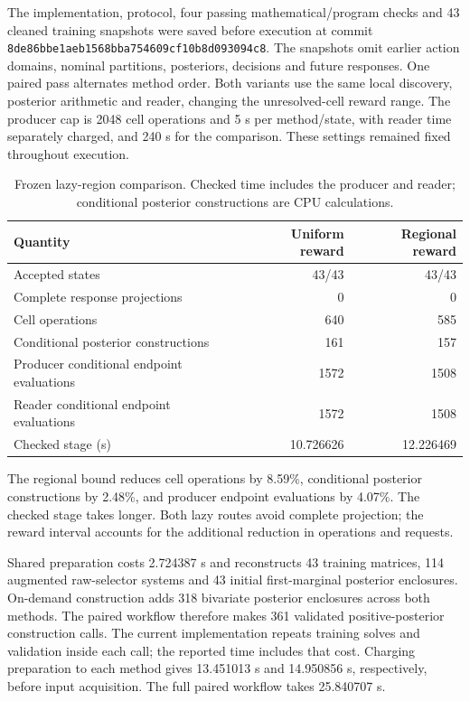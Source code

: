 The implementation, protocol, four passing mathematical/program checks and 43 cleaned training snapshots were saved before execution at commit \texttt{8de86bbe1aeb1568bba754609cf10b8d093094c8}. The snapshots omit earlier action domains, nominal partitions, posteriors, decisions and future responses. One paired pass alternates method order. Both variants use the same local discovery, posterior arithmetic and reader, changing the unresolved-cell reward range. The producer cap is 2048 cell operations and 5 s per method/state, with reader time separately charged, and 240 s for the comparison. These settings remained fixed throughout execution.

\begin{table}[htbp]\centering\small
\caption{Frozen lazy-region comparison. Checked time includes the producer and reader; conditional posterior constructions are CPU calculations.}\label{tab:lazy_summary}
\begin{tabular}{lrr}\toprule
Quantity & Uniform reward & Regional reward\\\midrule
Accepted states & 43/43 & 43/43\\
Complete response projections & 0 & 0\\
Cell operations & 640 & 585\\
Conditional posterior constructions & 161 & 157\\
Producer conditional endpoint evaluations & 1572 & 1508\\
Reader conditional endpoint evaluations & 1572 & 1508\\
Checked stage (s) & 10.726626 & 12.226469\\
\bottomrule\end{tabular}\end{table}

The regional bound reduces cell operations by 8.59\%, conditional posterior constructions by 2.48\%, and producer endpoint evaluations by 4.07\%. The checked stage takes longer. Both lazy routes avoid complete projection; the reward interval accounts for the additional reduction in operations and requests.

Shared preparation costs 2.724387 s and reconstructs 43 training matrices, 114 augmented raw-selector systems and 43 initial first-marginal posterior enclosures. On-demand construction adds 318 bivariate posterior enclosures across both methods. The paired workflow therefore makes 361 validated positive-posterior construction calls. The current implementation repeats training solves and validation inside each call; the reported time includes that cost. Charging preparation to each method gives 13.451013 s and 14.950856 s, respectively, before input acquisition. The full paired workflow takes 25.840707 s.

